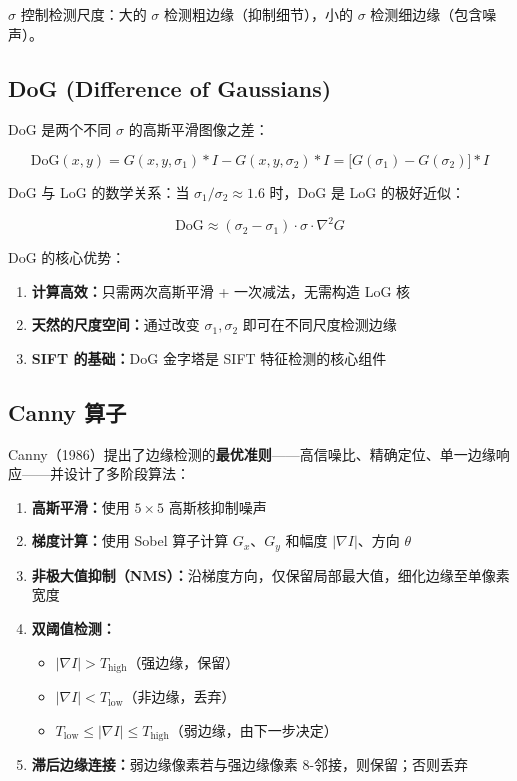 \documentclass[12pt,a4paper]{ctexart}
\begin{document}
$\sigma$ 控制检测尺度：大的 $\sigma$ 检测粗边缘（抑制细节），小的 $\sigma$ 检测细边缘（包含噪声）。

\subsection{DoG (Difference of Gaussians)}

DoG 是两个不同 $\sigma$ 的高斯平滑图像之差：

\begin{equation}
    \text{DoG}(x,y) = G(x,y,\sigma_1) * I - G(x,y,\sigma_2) * I = \big[G(\sigma_1) - G(\sigma_2)\big] * I
    \label{eq:dog}
\end{equation}

DoG 与 LoG 的数学关系：当 $\sigma_1 / \sigma_2 \approx 1.6$ 时，DoG 是 LoG 的极好近似：

\begin{equation}
    \text{DoG} \approx (\sigma_2 - \sigma_1) \cdot \sigma \cdot \nabla^2 G
    \label{eq:dog_log}
\end{equation}

DoG 的核心优势：
\begin{enumerate}[leftmargin=*]
    \item \textbf{计算高效：}只需两次高斯平滑 + 一次减法，无需构造 LoG 核
    \item \textbf{天然的尺度空间：}通过改变 $\sigma_1, \sigma_2$ 即可在不同尺度检测边缘
    \item \textbf{SIFT 的基础：}DoG 金字塔是 SIFT 特征检测的核心组件
\end{enumerate}

\subsection{Canny 算子}

Canny（1986）提出了边缘检测的\textbf{最优准则}——高信噪比、精确定位、单一边缘响应——并设计了多阶段算法：

\begin{enumerate}[leftmargin=*]
    \item \textbf{高斯平滑：}使用 $5\times5$ 高斯核抑制噪声
    \item \textbf{梯度计算：}使用 Sobel 算子计算 $G_x$、$G_y$ 和幅度 $|\nabla I|$、方向 $\theta$
    \item \textbf{非极大值抑制（NMS）：}沿梯度方向，仅保留局部最大值，细化边缘至单像素宽度
    \item \textbf{双阈值检测：}
        \begin{itemize}
            \item $|\nabla I| > T_{\text{high}}$（强边缘，保留）
            \item $|\nabla I| < T_{\text{low}}$（非边缘，丢弃）
            \item $T_{\text{low}} \le |\nabla I| \le T_{\text{high}}$（弱边缘，由下一步决定）
        \end{itemize}
    \item \textbf{滞后边缘连接：}弱边缘像素若与强边缘像素 8-邻接，则保留；否则丢弃
\end{enumerate}
\end{document}
